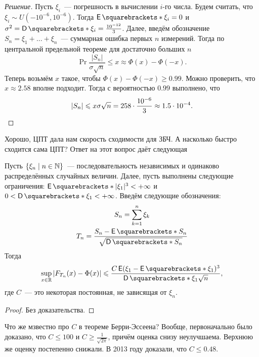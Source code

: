 \begin{proof}[Решение]
	Пусть \(\xi_{i}\)~--- погрешность в вычислении \(i\)-го числа. Будем считать, что \(\xi_{i} \sim U(-10^{-6}, 10^{-6})\). Тогда \(\E{\xi_{i}} = 0\) и \(\sigma^2 = \D{\xi_{i}} = \frac{10^{-12}}{3}\). Далее, введём обозначение \(S_n = \xi_{1} + \dots + \xi_{n}\)~--- суммарная ошибка первых \(n\) измерений. Тогда по центральной предельной теореме для достаточно больших \(n\)
	\[
		\Pr{\frac{|S_n|}{\sigma\sqrt{n}} \leq x} \approx \Phi(x) - \Phi(-x).
	\]
	Теперь возьмём \(x\) такое, чтобы \(\Phi(x) - \Phi(-x) \geq 0.99\). Можно проверить, что \(x \approx 2.58\) вполне подходит. Тогда с вероятностью \(0.99\) выполнено, что
	\[
		|S_n| \leq x\sigma\sqrt{n} = 258 \cdot \frac{10^{-6}}{3} \approx 1.5 \cdot 10^{-4}.\qedhere
	\]
\end{proof}

Хорошо, ЦПТ дала нам скорость сходимости для ЗБЧ. А насколько быстро сходится сама ЦПТ? Ответ на этот вопрос даёт следующая 
\begin{theorem}
	Пусть \(\{\xi_{n} \mid n \in \N\}\)~--- последовательность независимых и одинаково распределённых случайных величин. Далее, пусть выполнены следующие ограничения: \(\E{|\xi_1|^3} < +\infty\) и \(0 < \D{\xi_1} < +\infty\). Введём следующие обозначения:
	\begin{gather*}
		S_n = \sum_{k = 1}^{n} \xi_{k} \\
		T_n = \frac{S_n - \E{S_n}}{\sqrt{\D{S_n}}}
	\end{gather*}
	Тогда
	\[
		\sup_{x \in \R} \left|F_{T_n}(x) - \Phi(x)\right| \leq \frac{C\E(\xi_{1} - \E{\xi_{1}})^3}{\D{\xi_{1}}\sqrt{n}},
	\]
	где \(C\)~--- это некоторая постоянная, не зависящая от \(\xi_{n}\).
\end{theorem}
\begin{proof}
	Без доказательства.
\end{proof}
Что же мзвестно про \(C\) в теореме Берри-Эссеена? Вообще, первоначально было доказано, что \(C \leq 100\) и \(C \geq \frac{1}{\sqrt{2\pi}}\), причём оценка снизу неулучшаема. Верхнюю же оценку постепенно снижали. В 2013 году доказали, что \(C \leq 0.48\).

